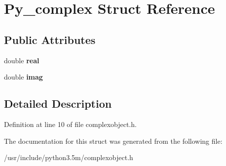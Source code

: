 \hypertarget{structPy__complex}{}\section{Py\+\_\+complex Struct Reference}
\label{structPy__complex}
\subsection*{Public Attributes}
\begin{DoxyCompactItemize}
\item 
double {\bfseries real}\hypertarget{structPy__complex_aac636cf827db042e0e9dd8737a669ad3}{}\label{structPy__complex_aac636cf827db042e0e9dd8737a669ad3}

\item 
double {\bfseries imag}\hypertarget{structPy__complex_ac526cca68a8fab49c976359998e44d92}{}\label{structPy__complex_ac526cca68a8fab49c976359998e44d92}

\end{DoxyCompactItemize}


\subsection{Detailed Description}


Definition at line 10 of file complexobject.\+h.



The documentation for this struct was generated from the following file\+:\begin{DoxyCompactItemize}
\item 
/usr/include/python3.\+5m/complexobject.\+h\end{DoxyCompactItemize}
